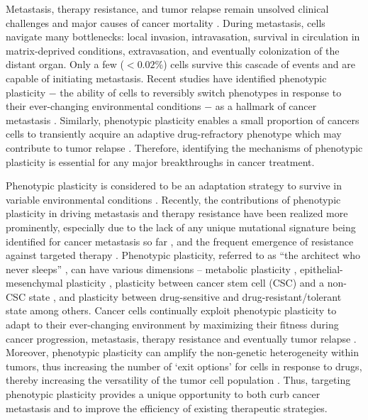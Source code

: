 \documentclass[preprint,review,12pt]{elsarticle}
\begin{document}
	Metastasis, therapy resistance, and tumor relapse remain unsolved clinical challenges and major causes of cancer mortality \cite{Ben-Jacob2012a}. During metastasis, cells navigate many bottlenecks: local invasion, intravasation, survival in circulation in matrix-deprived conditions, extravasation, and eventually colonization of the distant organ. Only a few ($<0.02\%$) cells survive this cascade of events and are capable of initiating metastasis. Recent studies have identified phenotypic plasticity $-$ the ability of cells to reversibly switch phenotypes in response to their ever-changing environmental conditions $-$ as a hallmark of cancer metastasis \cite{Celia-Terrassa2016a}. Similarly, phenotypic plasticity enables a small proportion of cancers cells to transiently acquire an adaptive drug-refractory phenotype which may contribute to tumor relapse \cite{Boumahdi2019a}. Therefore, identifying the mechanisms of phenotypic plasticity is essential for any major breakthroughs in cancer treatment.
	
	Phenotypic plasticity is considered to be an adaptation strategy to survive in variable environmental conditions \cite{Xue2018}. Recently, the contributions of phenotypic plasticity in driving metastasis and therapy resistance have been realized more prominently, especially due to the lack of any unique mutational signature being identified for cancer metastasis so far \cite{Celia-Terrassa2016a}, and the frequent emergence of resistance against targeted therapy \cite{Boumahdi2019a}. Phenotypic plasticity, referred to as ``the architect who never sleeps'' \cite{Varga2014}, can have various dimensions -- metabolic plasticity \cite{Lehuede2016}, epithelial-mesenchymal plasticity \cite{Bhatia2017a}, plasticity between cancer stem cell (CSC) and a non-CSC state \cite{Gupta2011a,Jolly2015,Fumagalli2019}, and plasticity between drug-sensitive and drug-resistant/tolerant state \cite{Goldman2015} among others. Cancer cells continually exploit phenotypic plasticity to adapt to their ever-changing environment by maximizing their fitness during cancer progression, metastasis, therapy resistance and eventually tumor relapse \cite{Gupta2019}. Moreover, phenotypic plasticity can amplify the non-genetic heterogeneity within tumors, thus increasing the number of ‘exit options’ for cells in response to drugs, thereby increasing the versatility of the tumor cell population \cite{Jolly2019}. Thus, targeting phenotypic plasticity provides a unique opportunity to both curb cancer metastasis and to improve the efficiency of existing therapeutic strategies.
	
\end{document}
